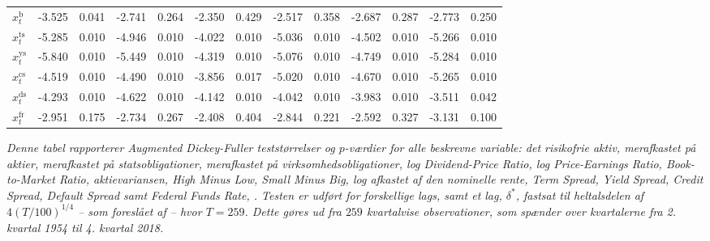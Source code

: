 \documentclass[
  a4paper,
  oneside]{memoir}
\begin{document}
\begin{table}[H]
{\begin{threeparttable}
\begin{tabular}[t]{lcccccccccccc}
\rowcolor{gray!6}  $x_t^{\text{b}}$ & -3.525 & 0.041 & -2.741 & 0.264 & -2.350 & 0.429 & -2.517 & 0.358 & -2.687 & 0.287 & -2.773 & 0.250\\
$x_t^{\text{ts}}$ & -5.285 & 0.010 & -4.946 & 0.010 & -4.022 & 0.010 & -5.036 & 0.010 & -4.502 & 0.010 & -5.266 & 0.010\\
\rowcolor{gray!6}  $x_t^{\text{ys}}$ & -5.840 & 0.010 & -5.449 & 0.010 & -4.319 & 0.010 & -5.076 & 0.010 & -4.749 & 0.010 & -5.284 & 0.010\\
$x_t^{\text{cs}}$ & -4.519 & 0.010 & -4.490 & 0.010 & -3.856 & 0.017 & -5.020 & 0.010 & -4.670 & 0.010 & -5.265 & 0.010\\
\rowcolor{gray!6}  $x_t^{\text{ds}}$ & -4.293 & 0.010 & -4.622 & 0.010 & -4.142 & 0.010 & -4.042 & 0.010 & -3.983 & 0.010 & -3.511 & 0.042\\
$x_t^{\text{fr}}$ & -2.951 & 0.175 & -2.734 & 0.267 & -2.408 & 0.404 & -2.844 & 0.221 & -2.592 & 0.327 & -3.131 & 0.100\\
\bottomrule
\end{tabular}
\begin{tablenotes}
\item \textit{Denne tabel rapporterer Augmented Dickey-Fuller teststørrelser og $p$-værdier for alle beskrevne variable: det risikofrie aktiv, merafkastet på aktier, merafkastet på statsobligationer, merafkastet på virksomhedsobligationer, log Dividend-Price Ratio, log Price-Earnings Ratio, Book-to-Market Ratio, aktievariansen, High Minus Low, Small Minus Big, log afkastet af den nominelle rente, Term Spread, Yield Spread, Credit Spread, Default Spread samt Federal Funds Rate, \citep{Dickey1979}. Testen er udført for forskellige lags, samt et lag, $\delta^*$, fastsat til heltalsdelen af $4(T/100)^{1/4}$ -- som foreslået af \citep{Schwert1989} -- hvor $T=259$. Dette gøres ud fra $259$ kvartalvise observationer, som spænder over kvartalerne fra 2. kvartal 1954 til 4. kvartal 2018.}
\end{tablenotes}
\end{threeparttable}}
\end{table}
\end{document}

